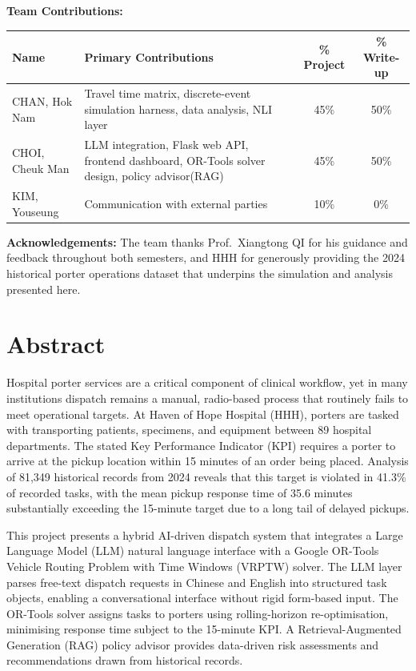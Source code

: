 \documentclass[12pt,a4paper]{article}
\begin{document}
\vspace{0.8em}
\textbf{Team Contributions:}

\begin{center}
\begin{tabular}{p{3.2cm}p{6.5cm}cc}
\toprule
\textbf{Name} & \textbf{Primary Contributions} & \textbf{\% Project} & \textbf{\% Write-up} \\
\midrule
CHAN, Hok Nam    & Travel time matrix,  discrete-event simulation harness, data analysis, NLI layer& 45\%& 50\%\\[4pt]
CHOI, Cheuk Man & LLM integration, Flask web API, frontend dashboard, OR-Tools solver design, policy advisor(RAG)& 45\%& 50\%\\[4pt]
KIM, Youseung   & Communication with external parties& 10\%& 0\%\\
\bottomrule
\end{tabular}
\end{center}

\vspace{0.8em}
\textbf{Acknowledgements:}
The team thanks Prof.\ Xiangtong QI for his guidance and feedback throughout both semesters, and HHH for generously providing the 2024 historical porter operations dataset that underpins the simulation and analysis presented here.

\newpage
\section*{Abstract}

Hospital porter services are a critical component of clinical workflow, yet in many institutions dispatch remains a manual, radio-based process that routinely fails to meet operational targets. At Haven of Hope Hospital (HHH), porters are tasked with transporting patients, specimens, and equipment between 89 hospital departments. The stated Key Performance Indicator (KPI) requires a porter to arrive at the pickup location within 15 minutes of an order being placed. Analysis of 81,349 historical records from 2024 reveals that this target is violated in 41.3\% of recorded tasks, with the mean pickup response time of 35.6 minutes substantially exceeding the 15-minute target due to a long tail of delayed pickups.

This project presents a hybrid AI-driven dispatch system that integrates a Large Language Model (LLM) natural language interface with a Google OR-Tools Vehicle Routing Problem with Time Windows (VRPTW) solver. The LLM layer parses free-text dispatch requests in Chinese and English into structured task objects, enabling a conversational interface without rigid form-based input. The OR-Tools solver assigns tasks to porters using rolling-horizon re-optimisation, minimising response time subject to the 15-minute KPI. A Retrieval-Augmented Generation (RAG) policy advisor provides data-driven risk assessments and recommendations drawn from historical records.
\end{document}
